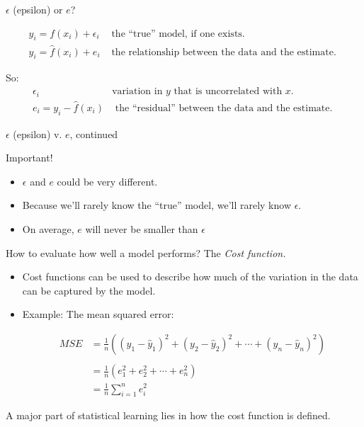 \documentclass[aspectratio=169, handout]{beamer}
\begin{document}
\begin{frame}{$\epsilon$ (epsilon) or $e$?}

\begin{eqnarray*}
y_i = f(x_i) + \epsilon_i & \text{ the ``true'' model, if one exists. }\\
y_i = \hat{f}(x_i) + e_i & \text{ the relationship between the data and the estimate. }
\end{eqnarray*}

\hspace{5mm}
\pause

So:
\begin{eqnarray*}
\epsilon_i&\text{variation in $y$ that is uncorrelated with $x$.}\\
e_i = y_i - \hat{f}(x_i) & \text{ the ``residual'' between the data and the estimate. }
\end{eqnarray*}

\end{frame}

\begin{frame}{$\epsilon$ (epsilon) v. $e$, continued}

Important!  
\begin{itemize}
\item $\epsilon$ and $e$ could be very different.  
\item Because we'll rarely know the ``true'' model, we'll rarely know $\epsilon$.
\item On average, $e$ will never be smaller than $\epsilon$
\end{itemize}
\end{frame}

\begin{frame}{How to evaluate how well a model performs? The \textit{Cost function.}}


\begin{itemize}
\item Cost functions can be used to describe how much of the variation in the data can be captured by the model.
\item Example: The mean squared error:

\pause 
\begin{align*}
MSE &= \frac{1}{n} ((y_1 - \hat{y}_1)^2 + (y_2 - \hat{y}_2)^2 + \cdots + (y_n - \hat{y}_n)^2) \\\\
&= \frac{1}{n} (e_1^2 + e_2^2 + \cdots + e_n^2) \\
&=\frac{1}{n} \sum_{i=1}^n e_i^2
\end{align*}
\end{itemize}

\pause
A major part of statistical learning lies in how the cost function is defined.

\end{frame}
\end{document}
